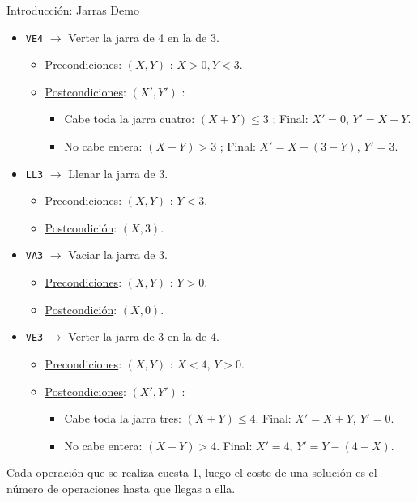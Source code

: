 \documentclass[11pt, a4paper, spanish, openright, twoside]{book}
\begin{document}
\begin{section}{Introducción: Jarras Demo}
\begin{itemize}
		\item \texttt{VE4} $\rightarrow$ Verter la jarra de 4 en la de 3.
			\begin{itemize}
				\item \underline{Precondiciones}: $(X, Y)$ : $X > 0, Y < 3$.
				\item \underline{Postcondiciones}: $(X', Y')$ : 
				\begin{itemize}
					\item Cabe toda la jarra cuatro:  $(X + Y) \le 3$ ; Final: $X'= 0$, $Y' = X + Y$.
					\item No cabe entera: $(X + Y) > 3$ ;	Final: $X'= X - (3 - Y)$, $Y'= 3$.
				\end{itemize}
			\end{itemize}

		\item \texttt{LL3} $\rightarrow$ Llenar la jarra de 3.
			\begin{itemize}
			\item \underline{Precondiciones}: $(X, Y)$ : $Y < 3$.
			\item \underline{Postcondición}: $(X, 3)$.
			\end{itemize}
		
		\item \texttt{VA3} $\rightarrow$ Vaciar la jarra de 3.
			\begin{itemize}
			\item \underline{Precondiciones}: $(X, Y)$ : $Y > 0$.
			\item \underline{Postcondición}: $(X, 0)$.
			\end{itemize}
		\item \texttt{VE3} $\rightarrow$ Verter la jarra de 3 en la de 4.
			\begin{itemize}
				\item \underline{Precondiciones}: $(X, Y)$ : $X < 4$, $Y > 0$.
				\item \underline{Postcondiciones}: $(X', Y')$ : 
				\begin{itemize}
					\item Cabe toda la jarra tres: $(X + Y) \le 4$.  Final: $X'= X + Y$, $Y' = 0$.
					\item No cabe entera: $(X + Y) > 4$. Final: $X'= 4$, $Y'= Y - (4 - X)$.
				\end{itemize}
			\end{itemize}
		\end{itemize}
	
	Cada operación que se realiza cuesta 1, luego el coste de una 
				solución es el número de operaciones hasta que llegas a ella.
		

		
\end{section}
\end{document}
